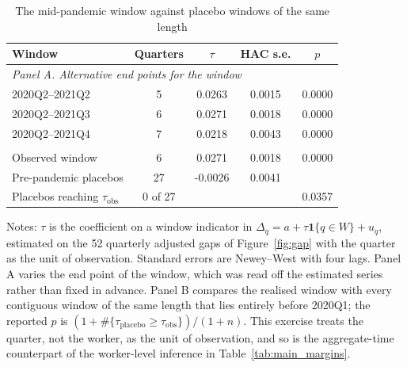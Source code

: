 \begin{table}[H]
\centering
\caption{The mid-pandemic window against placebo windows of the same length}
\label{tab:placebo}
\begin{threeparttable}
\begin{tabular}{lcccc}
\toprule
Window & Quarters & $\tau$ & HAC s.e. & $p$ \\
\midrule
\multicolumn{5}{l}{\textit{Panel A. Alternative end points for the window}} \\
\quad 2020Q2--2021Q2 & 5 & 0.0263 & 0.0015 & 0.0000 \\
\quad 2020Q2--2021Q3 & 6 & 0.0271 & 0.0018 & 0.0000 \\
\quad 2020Q2--2021Q4 & 7 & 0.0218 & 0.0043 & 0.0000 \\
\addlinespace
\multicolumn{5}{l}{\textit{Panel B. Placebo distribution}} \\
\quad Observed window & 6 & 0.0271 & 0.0018 & 0.0000 \\
\quad Pre-pandemic placebos & 27 & -0.0026 & 0.0041 & \\
\quad Placebos reaching $\tau_{\text{obs}}$ & 0 of 27 & & & 0.0357 \\
\bottomrule
\end{tabular}
\begin{tablenotes}[flushleft]\footnotesize
\item Notes: $\tau$ is the coefficient on a window indicator in $\Delta_q = a + \tau\mathbf{1}\{q \in W\} + u_q$, estimated on the 52 quarterly adjusted gaps of Figure~\ref{fig:gap} with the quarter as the unit of observation. Standard errors are Newey--West with four lags. Panel A varies the end point of the window, which was read off the estimated series rather than fixed in advance. Panel B compares the realised window with every contiguous window of the same length that lies entirely before 2020Q1; the reported $p$ is $(1+\#\{\tau_{\text{placebo}} \geq \tau_{\text{obs}}\})/(1+n)$. This exercise treats the quarter, not the worker, as the unit of observation, and so is the aggregate-time counterpart of the worker-level inference in Table~\ref{tab:main_margins}.
\end{tablenotes}
\end{threeparttable}
\end{table}
